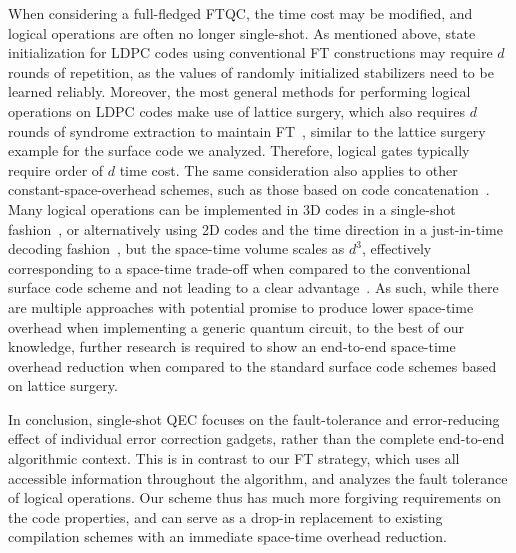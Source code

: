 When considering a full-fledged FTQC, the time cost may be modified, and logical operations are often no longer single-shot.
%
As mentioned above, state initialization for LDPC codes using conventional FT constructions may require $d$ rounds of repetition, as the values of randomly initialized stabilizers need to be learned reliably.
%
Moreover, the most general methods for performing logical operations on LDPC codes make use of lattice surgery, which also requires $d$ rounds of syndrome extraction to maintain FT~\cite{cohen2022low,xu2024constant}, similar to the lattice surgery example for the surface code we analyzed.
%
Therefore, logical gates typically require order of $d$ time cost.
%
The same consideration also applies to other constant-space-overhead schemes, such as those based on code concatenation~\cite{yamasaki2024time}.
%
Many logical operations can be implemented in 3D codes in a single-shot fashion~\cite{bombin2015single}, or alternatively using 2D codes and the time direction in a just-in-time decoding fashion~\cite{bombin2018,scruby2022numerical}, but the space-time volume scales as $d^3$, effectively corresponding to a space-time trade-off when compared to the conventional surface code scheme and not leading to a clear advantage~\cite{beverland2021cost}.
%
As such, while there are multiple approaches with potential promise to produce lower space-time overhead when implementing a generic quantum circuit, to the best of our knowledge, further research is required to show an end-to-end space-time overhead reduction when compared to the standard surface code schemes based on lattice surgery.

In conclusion, single-shot QEC focuses on the fault-tolerance and error-reducing effect of individual error correction gadgets, rather than the complete end-to-end algorithmic context.
%
This is in contrast to our FT strategy, which uses all accessible information throughout the algorithm, and analyzes the fault tolerance of logical operations.
%
Our scheme thus has much more forgiving requirements on the code properties, and can serve as a drop-in replacement to existing compilation schemes with an immediate space-time overhead reduction.